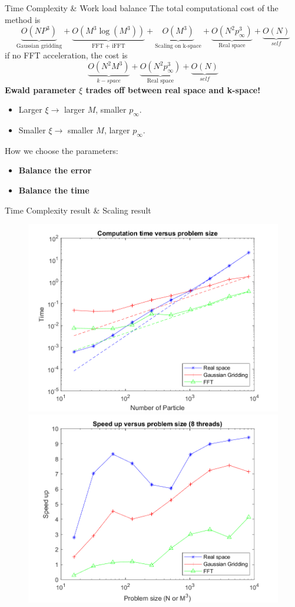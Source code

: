 \documentclass{beamer}
\begin{document}
\begin{frame}{Time Complexity \& Work load balance}
The total computational cost of the method is
\begin{equation}
\underbrace{O(NP^3)}_{\text{Gaussian gridding}} + \underbrace{O(M^3 \log(M^3))}_{\text{FFT + iFFT}} + \underbrace{O(M^3)}_{\text{Scaling on k-space}} + \underbrace{O(N^2 p_{\infty}^3)}_{\text{Real space}} + \underbrace{O(N)}_{self}
\end{equation}
if no FFT acceleration, the cost is
\begin{equation}
\underbrace{O(N^2M^3)}_{k-space} + \underbrace{O(N^2 p_{\infty}^3)}_{\text{Real space}} + \underbrace{O(N)}_{self}
\end{equation}
\textbf{Ewald parameter $\xi$ trades off between real space and k-space!}
\begin{itemize}
	\item Larger $\xi \rightarrow$ larger $M$, smaller $p_{\infty}$.
	\item Smaller $\xi \rightarrow$ smaller $M$, larger $p_{\infty}$.
\end{itemize}
How we choose the parameters:
\begin{itemize}
	\item \textbf{Balance the error} \\
	\item \textbf{Balance the time}
\end{itemize}
\end{frame}

\begin{frame}{Time Complexity result \& Scaling result}
\begin{figure}[H]\centering
	\includegraphics[width=.4\textwidth]{time_versus_np}
	\includegraphics[width=.4\textwidth]{speed_up_versus_np}
\end{figure}
\end{frame}
\end{document}
